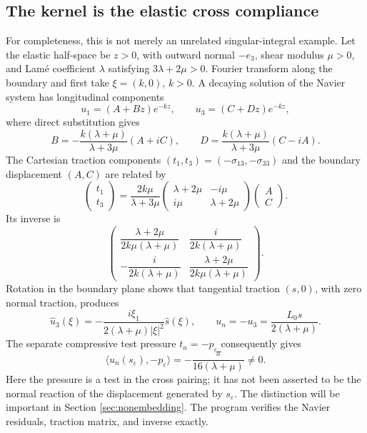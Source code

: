 \documentclass[11pt,a4paper]{article}
\theoremstyle{definition}\newtheorem{definition}[theorem]{Definition}
\theoremstyle{remark}\newtheorem{remark}[theorem]{Remark}
\newcommand{\ip}[2]{\langle #1,#2\rangle}
\numberwithin{equation}{section}
\begin{document}
\subsection{The kernel is the elastic cross compliance}
For completeness, this is not merely an unrelated singular-integral example. Let the elastic half-space be $z>0$, with outward normal $-e_3$, shear modulus $\mu>0$, and Lam\'e coefficient $\lambda$ satisfying $3\lambda+2\mu>0$. Fourier transform along the boundary and first take $\xi=(k,0)$, $k>0$. A decaying solution of the Navier system has longitudinal components
\[
 u_1=(A+Bz)e^{-kz},\qquad u_3=(C+Dz)e^{-kz},
\]
where direct substitution gives
\[
 B=-\frac{k(\lambda+\mu)}{\lambda+3\mu}(A+iC),\qquad
 D=\frac{k(\lambda+\mu)}{\lambda+3\mu}(C-iA).
\]
The Cartesian traction components $(t_1,t_3)=(-\sigma_{13},-\sigma_{33})$ and the boundary displacement $(A,C)$ are related by
\begin{equation}\label{eq:DtN}
 \begin{pmatrix}t_1\\t_3\end{pmatrix}
 =\frac{2k\mu}{\lambda+3\mu}
 \begin{pmatrix}\lambda+2\mu&-i\mu\\i\mu&\lambda+2\mu\end{pmatrix}
 \begin{pmatrix}A\\C\end{pmatrix}.
\end{equation}
Its inverse is
\begin{equation}\label{eq:NtD}
 \begin{pmatrix}
 \dfrac{\lambda+2\mu}{2k\mu(\lambda+\mu)}&\dfrac{i}{2k(\lambda+\mu)}\\[5pt]
 -\dfrac{i}{2k(\lambda+\mu)}&\dfrac{\lambda+2\mu}{2k\mu(\lambda+\mu)}
 \end{pmatrix}.
\end{equation}
Rotation in the boundary plane shows that tangential traction $(s,0)$, with zero normal traction, produces
\begin{equation}\label{eq:elasticcross}
 \widehat u_3(\xi)=-\frac{i\xi_1}{2(\lambda+\mu)|\xi|^2}\widehat s(\xi),
 \qquad u_n=-u_3=\frac{L_0s}{2(\lambda+\mu)}.
\end{equation}
The separate compressive test pressure $t_n=-p_\varepsilon$ consequently gives
\[
 \ip{u_n(s_\varepsilon)}{-p_\varepsilon}
 =-\frac{\pi}{16(\lambda+\mu)}\ne0.
\]
Here the pressure is a test in the cross pairing; it has not been asserted to be the normal reaction of the displacement generated by $s_\varepsilon$. The distinction will be important in Section \ref{sec:nonembedding}. The program verifies the Navier residuals, traction matrix, and inverse exactly.
\end{document}
